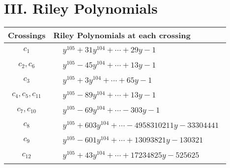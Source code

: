 \documentclass[1p]{elsarticle_modified}
\theoremstyle{definition}
\begin{document}
\centering \section*{ III. Riley Polynomials}
\begin{tabular}{m{50pt}|m{274pt}}
Crossings & \hspace{64pt}Riley Polynomials at each crossing \\
\hline $$\begin{aligned}c_{1}\end{aligned}$$&$\begin{aligned}
&y^{105}+31 y^{104}+\cdots+29 y-1
\end{aligned}$\\
\hline $$\begin{aligned}c_{2},c_{6}\end{aligned}$$&$\begin{aligned}
&y^{105}-45 y^{104}+\cdots+13 y-1
\end{aligned}$\\
\hline $$\begin{aligned}c_{3}\end{aligned}$$&$\begin{aligned}
&y^{105}+3 y^{104}+\cdots+65 y-1
\end{aligned}$\\
\hline $$\begin{aligned}c_{4},c_{5},c_{11}\end{aligned}$$&$\begin{aligned}
&y^{105}-89 y^{104}+\cdots+13 y-1
\end{aligned}$\\
\hline $$\begin{aligned}c_{7},c_{10}\end{aligned}$$&$\begin{aligned}
&y^{105}-69 y^{104}+\cdots-303 y-1
\end{aligned}$\\
\hline $$\begin{aligned}c_{8}\end{aligned}$$&$\begin{aligned}
&y^{105}+603 y^{104}+\cdots-4958310211 y-33304441
\end{aligned}$\\
\hline $$\begin{aligned}c_{9}\end{aligned}$$&$\begin{aligned}
&y^{105}-601 y^{104}+\cdots+13093821 y-130321
\end{aligned}$\\
\hline $$\begin{aligned}c_{12}\end{aligned}$$&$\begin{aligned}
&y^{105}+43 y^{104}+\cdots+17234825 y-525625
\end{aligned}$\\
\hline
\end{tabular}
\vskip 2pc
\end{document}
